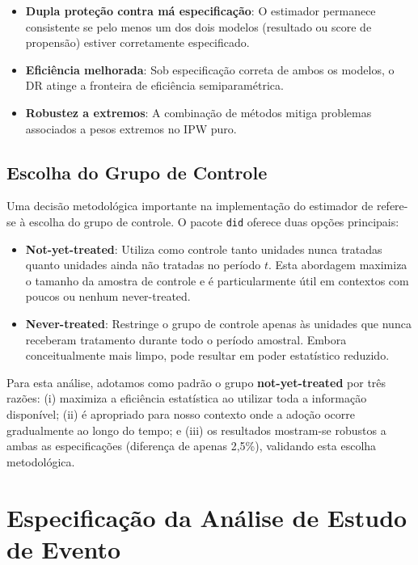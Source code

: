 \documentclass[
	12pt,				%
	oneside,			%
	a4paper,			%
	english,			%
	french,				%
	spanish,			%
	brazil				%
	]{abntex2}
\begin{document}
\begin{itemize}
\item \textbf{Dupla proteção contra má especificação}: O estimador permanece consistente se pelo menos um dos dois modelos (resultado ou score de propensão) estiver corretamente especificado.

\item \textbf{Eficiência melhorada}: Sob especificação correta de ambos os modelos, o DR atinge a fronteira de eficiência semiparamétrica.

\item \textbf{Robustez a extremos}: A combinação de métodos mitiga problemas associados a pesos extremos no IPW puro.
\end{itemize}

\subsection{Escolha do Grupo de Controle}

Uma decisão metodológica importante na implementação do estimador de  refere-se à escolha do grupo de controle. O pacote \texttt{did} oferece duas opções principais:

\begin{itemize}
\item \textbf{Not-yet-treated}: Utiliza como controle tanto unidades nunca tratadas quanto unidades ainda não tratadas no período $t$. Esta abordagem maximiza o tamanho da amostra de controle e é particularmente útil em contextos com poucos ou nenhum never-treated.

\item \textbf{Never-treated}: Restringe o grupo de controle apenas às unidades que nunca receberam tratamento durante todo o período amostral. Embora conceitualmente mais limpo, pode resultar em poder estatístico reduzido.
\end{itemize}

Para esta análise, adotamos como padrão o grupo \textbf{not-yet-treated} por três razões: (i) maximiza a eficiência estatística ao utilizar toda a informação disponível; (ii) é apropriado para nosso contexto onde a adoção ocorre gradualmente ao longo do tempo; e (iii) os resultados mostram-se robustos a ambas as especificações (diferença de apenas 2,5\%), validando esta escolha metodológica.

\section{Especificação da Análise de Estudo de Evento}
\end{document}
